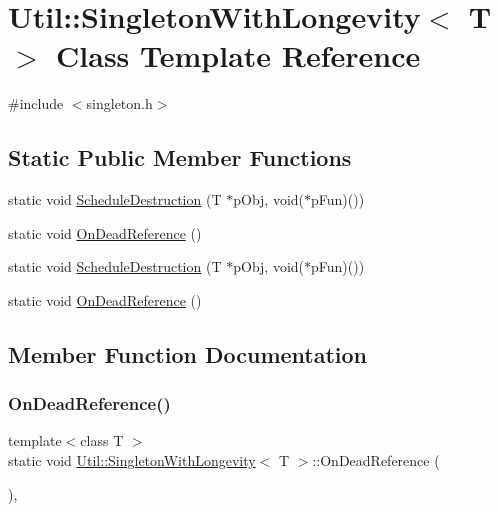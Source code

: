\hypertarget{classUtil_1_1SingletonWithLongevity}{}\section{Util\+:\+:Singleton\+With\+Longevity$<$ T $>$ Class Template Reference}
\label{classUtil_1_1SingletonWithLongevity}


{\ttfamily \#include $<$singleton.\+h$>$}

\subsection*{Static Public Member Functions}
\begin{DoxyCompactItemize}
\item 
static void \mbox{\hyperlink{classUtil_1_1SingletonWithLongevity_acada28acaf9030754388818a79b0468d}{Schedule\+Destruction}} (T $\ast$p\+Obj, void($\ast$p\+Fun)())
\item 
static void \mbox{\hyperlink{classUtil_1_1SingletonWithLongevity_a8eafdc86338509e86107e686fc22cbed}{On\+Dead\+Reference}} ()
\item 
static void \mbox{\hyperlink{classUtil_1_1SingletonWithLongevity_acada28acaf9030754388818a79b0468d}{Schedule\+Destruction}} (T $\ast$p\+Obj, void($\ast$p\+Fun)())
\item 
static void \mbox{\hyperlink{classUtil_1_1SingletonWithLongevity_a8eafdc86338509e86107e686fc22cbed}{On\+Dead\+Reference}} ()
\end{DoxyCompactItemize}


\subsection{Member Function Documentation}
\mbox{\label{classUtil_1_1SingletonWithLongevity_a8eafdc86338509e86107e686fc22cbed}} 
\subsubsection{\texorpdfstring{OnDeadReference()}{OnDeadReference()}\hspace{0.1cm}{\footnotesize\ttfamily [1/2]}}
{\footnotesize\ttfamily template$<$class T $>$ \\
static void \mbox{\hyperlink{classUtil_1_1SingletonWithLongevity}{Util\+::\+Singleton\+With\+Longevity}}$<$ T $>$\+::On\+Dead\+Reference (\begin{DoxyParamCaption}{ }\end{DoxyParamCaption})\hspace{0.3cm}{\ttfamily [inline]}, {\ttfamily [static]}}

